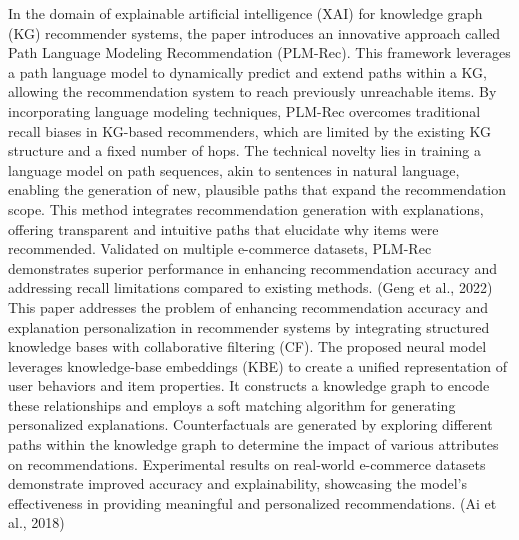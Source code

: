 In the domain of explainable artificial intelligence (XAI) for knowledge graph (KG) recommender systems, the paper introduces an innovative approach called Path Language Modeling Recommendation (PLM-Rec). This framework leverages a path language model to dynamically predict and extend paths within a KG, allowing the recommendation system to reach previously unreachable items. By incorporating language modeling techniques, PLM-Rec overcomes traditional recall biases in KG-based recommenders, which are limited by the existing KG structure and a fixed number of hops. The technical novelty lies in training a language model on path sequences, akin to sentences in natural language, enabling the generation of new, plausible paths that expand the recommendation scope. This method integrates recommendation generation with explanations, offering transparent and intuitive paths that elucidate why items were recommended. Validated on multiple e-commerce datasets, PLM-Rec demonstrates superior performance in enhancing recommendation accuracy and addressing recall limitations compared to existing methods. (Geng et al., 2022)
This paper addresses the problem of enhancing recommendation accuracy and explanation personalization in recommender systems by integrating structured knowledge bases with collaborative filtering (CF). The proposed neural model leverages knowledge-base embeddings (KBE) to create a unified representation of user behaviors and item properties. It constructs a knowledge graph to encode these relationships and employs a soft matching algorithm for generating personalized explanations. Counterfactuals are generated by exploring different paths within the knowledge graph to determine the impact of various attributes on recommendations. Experimental results on real-world e-commerce datasets demonstrate improved accuracy and explainability, showcasing the model's effectiveness in providing meaningful and personalized recommendations. (Ai et al., 2018)

